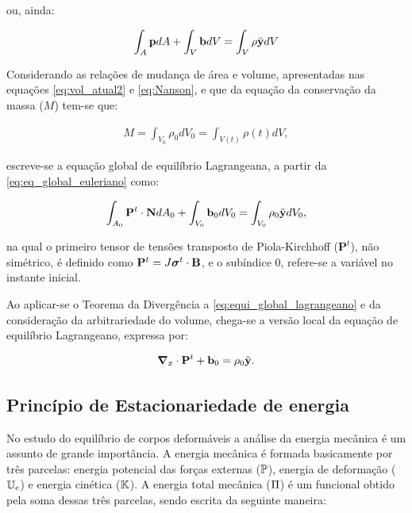 \noindent ou, ainda:

\begin{align}
	\int_{A} \mathbf{p} dA + \int_{V} \mathbf{b} dV = \int_{V} \rho  \ddot{\mathbf{y}} dV 
\end{align}

Considerando as relações de mudança de área e volume, apresentadas nas equações \autoref{eq:vol_atual2} e \autoref{eq:Nanson}, e que da equação da conservação da massa ($M$) tem-se que:

\begin{align}
	M = \int_{V_{0}} \rho_{0}dV_{0} = \int_{V(t)} \rho(t)dV, \label{eq:conser_massa}
\end{align}

\noindent escreve-se a equação global de equilíbrio Lagrangeana, a partir da \autoref{eq:eq_global_euleriano} como:

\begin{align}
	\int_{A_0} \mathbf{P}^t \cdot \mathbf{N} dA_0 + \int_{V_0} \mathbf{b}_0 dV_0 = \int_{V_0} \rho_0  \ddot{\mathbf{y}} dV_0, \label{eq:equi_global_lagrangeano}
\end{align}

\noindent na qual o primeiro tensor de tensões transposto de Piola-Kirchhoff ($\mathbf{P}^t$), não simétrico, é definido como $\mathbf{P}^t = J \boldsymbol{\sigma}^t \cdot \mathbf{B}$, e o subíndice $0$, refere-se a variável no instante inicial.

Ao aplicar-se o Teorema da Divergência a \autoref{eq:equi_global_lagrangeano} e da consideração da arbitrariedade do volume, chega-se a versão local da equação de equilíbrio Lagrangeano, expressa por:

\begin{align}
	\boldsymbol{\nabla}_x \cdot \mathbf{P}^t +  \mathbf{b}_0 = \rho_0  \ddot{\mathbf{y}}. \label{eq:equi_local_lagrangeano}
\end{align}


\subsection{Princípio de Estacionariedade de energia}

No estudo do equilíbrio de corpos deformáveis a análise da energia mecânica é um assunto de grande importância. A energia mecânica é formada basicamente por três parcelas: energia potencial das forças externas ($\mathbb{P}$), energia de deformação ($\mathbb{U}_e$) e energia cinética ($\mathbb{K}$). A energia total mecânica ($\Pi$) é um funcional obtido pela soma dessas três parcelas, sendo escrita da seguinte maneira:

